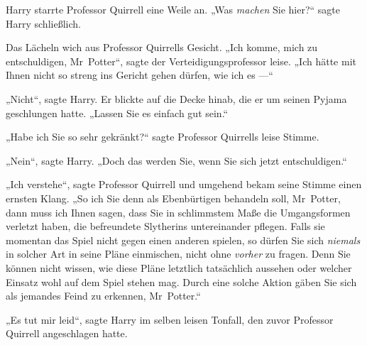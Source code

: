 Harry starrte Professor Quirrell eine Weile an.
„Was \emph{machen} Sie hier?“ sagte Harry schließlich.

Das Lächeln wich aus Professor Quirrells Gesicht.
„Ich komme, mich zu entschuldigen, Mr~Potter“, sagte der Verteidigungsprofessor leise.
„Ich hätte mit Ihnen nicht so streng ins Gericht gehen dürfen, wie ich es —“

„Nicht“, sagte Harry. Er blickte auf die Decke hinab, die er um seinen Pyjama geschlungen hatte.
„Lassen Sie es einfach gut sein.“

„Habe ich Sie so sehr gekränkt?“ sagte Professor Quirrells leise Stimme.

„Nein“, sagte Harry.
„Doch das werden Sie, wenn Sie sich jetzt entschuldigen.“

„Ich verstehe“, sagte Professor Quirrell und umgehend bekam seine Stimme einen ernsten Klang.
„So ich Sie denn als Ebenbürtigen behandeln soll, Mr~Potter, dann muss ich Ihnen sagen, dass Sie in schlimmstem Maße die Umgangsformen verletzt haben, die befreundete Slytherins untereinander pflegen. Falls sie momentan das Spiel nicht gegen einen anderen spielen, so dürfen Sie sich \emph{niemals} in solcher Art in seine Pläne einmischen, nicht ohne \emph{vorher} zu fragen. Denn Sie können nicht wissen, wie diese Pläne letztlich tatsächlich aussehen oder welcher Einsatz wohl auf dem Spiel stehen mag. Durch eine solche Aktion gäben Sie sich als jemandes Feind zu erkennen, Mr~Potter.“

„Es tut mir leid“, sagte Harry im selben leisen Tonfall, den zuvor Professor Quirrell angeschlagen hatte.

